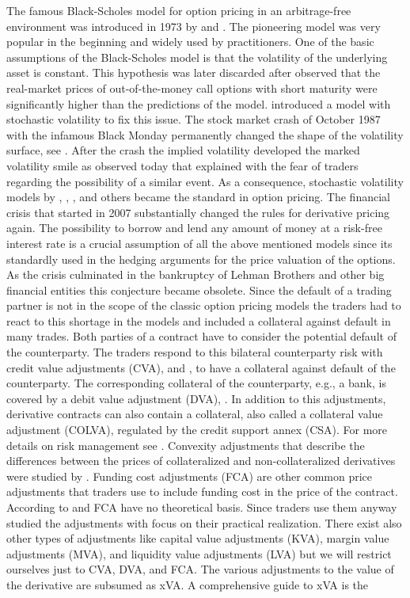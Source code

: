 \documentclass[a4paper,10pt]{article}
\newcommand{\1}{\mathbf{1}}
\begin{document}
The famous Black-Scholes model for option pricing in an arbitrage-free environment was introduced in 1973 by \cite{BlackScholes73} and \cite{Merton73}. The pioneering model was very popular in the beginning and widely used by practitioners. One of the basic assumptions of the Black-Scholes model is that the volatility of the underlying asset is constant. This hypothesis was later discarded after \cite{Rubinstein85} observed that the real-market prices of out-of-the-money call options with short maturity were significantly higher than the predictions of the model. \cite{HullWhite87} introduced a model with stochastic volatility to fix this issue. The stock market crash of October 1987 with the infamous Black Monday permanently changed the shape of the volatility surface, see \cite[Chapter 18.3]{Hull09}. After the crash the implied volatility developed the marked volatility smile as observed today that \cite{Rubinstein94} explained with the fear of traders regarding the possibility of a similar event. As a consequence, stochastic volatility models by \cite{HullWhite87}, \cite{SteinStein91}, \cite{Heston93}, and others became the standard in option pricing. The financial crisis that started in 2007 substantially changed the rules for derivative pricing again. The possibility to borrow and lend any amount of money at a risk-free interest rate is a crucial assumption of all the above mentioned models since its standardly used in the hedging arguments for the price valuation of the options. As the crisis culminated in the bankruptcy of Lehman Brothers and other big financial entities this conjecture became obsolete. Since the default of a trading partner is not in the scope of the classic option pricing models the traders had to react to this shortage in the models and included a collateral against default in many trades. Both parties of a contract have to consider the potential default of the counterparty. The traders respond to this bilateral counterparty risk with credit value adjustments (CVA), \cite{SorensonBollier94} and \cite{JarrowTurnbull95}, to have a collateral against default of the counterparty. The corresponding collateral of the counterparty, e.g., a bank, is covered by a debit value adjustment (DVA), \cite{DuffieHuang96}. In addition to this adjustments, derivative contracts can also contain a collateral, also called a collateral value adjustment (COLVA), regulated by the credit support annex (CSA). For more details on risk management see \cite{Hull18Risk}. Convexity adjustments that describe the differences between the prices of collateralized and non-collateralized derivatives were studied by \cite{Piterbarg10}. Funding cost adjustments (FCA) are other common price adjustments that traders use to include funding cost in the price of the contract. According to \cite{BurgardKjaer11} and \cite{HullWhite12} FCA have no theoretical basis. Since traders use them anyway \cite{HullWhite14} studied the adjustments with focus on their practical realization. There exist also other types of adjustments like capital value adjustments (KVA), margin value adjustments (MVA), and liquidity value adjustments (LVA) but we will restrict ourselves just to CVA, DVA, and FCA. The various adjustments to the value of the derivative are subsumed as xVA. A comprehensive guide to xVA is the 
\end{document}

